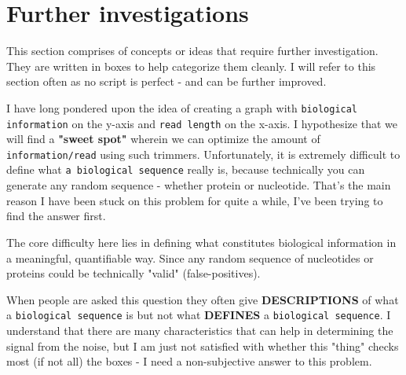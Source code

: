 \documentclass[11pt]{report}
\begin{document}
{\newpage
\pagestyle{fancy}
\fancyhf{}
\fancyhead[C]{\leftmark}  %
\fancyhead[R]{\thepage}

\part{Further investigations}

\renewcommand{\thesection}{\arabic{section}}
\setcounter{section}{0}
\setcounter{subsection}{0}

This section comprises of concepts or ideas that require further investigation. They are written in boxes to help categorize them cleanly. I will refer to this section often as no script is perfect - and can be further improved. 

\begin{tcolorbox}[colback=gray!10!white, coltitle=white, colframe=gray!80!black, title=Biological Information]
	\label{box:biological information}
	I have long pondered upon the idea of creating a graph with \texttt{biological information} on the y-axis and \texttt{read length} on the x-axis. I hypothesize that we will find a \textbf{"sweet spot" }wherein we can optimize the amount of \texttt{information/read} using such trimmers. Unfortunately, it is extremely difficult to define what \texttt{a biological sequence} really is, because technically you can generate any random sequence - whether protein or nucleotide. That's the main reason I have been stuck on this problem for quite a while, I've been trying to find the answer first.
	
	The core difficulty here lies in defining what constitutes biological information in a meaningful, quantifiable way. Since any random sequence of nucleotides or proteins could be technically "valid" (false-positives). 
	
	When people are asked this question they often give \textbf{DESCRIPTIONS} of what a \texttt{biological sequence} is but not what \textbf{DEFINES} a \texttt{biological sequence}. I understand that there are many characteristics that can help in determining the signal from the noise, but I am just not satisfied with whether this "thing" checks most (if not all) the boxes - I need a non-subjective answer to this problem. 
\end{tcolorbox}







\setcounter{section}{1}
\setcounter{subsection}{0}


}
\end{document}
